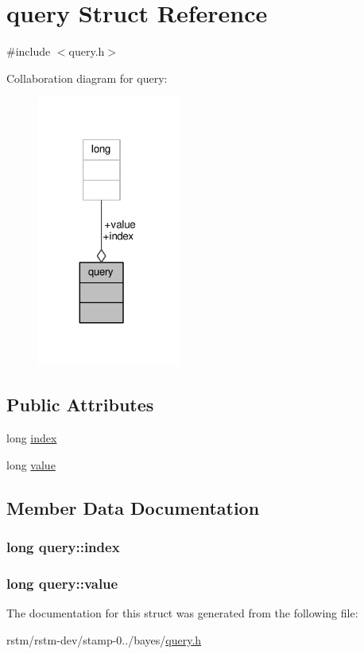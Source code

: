 \hypertarget{structquery}{\section{query Struct Reference}
\label{structquery}
}


{\ttfamily \#include $<$query.\-h$>$}



Collaboration diagram for query\-:
\nopagebreak
\begin{figure}[H]
\begin{center}
\leavevmode
\includegraphics[width=133pt]{structquery__coll__graph}
\end{center}
\end{figure}
\subsection*{Public Attributes}
\begin{DoxyCompactItemize}
\item 
long \hyperlink{structquery_a97d906000ed53eb3276cd918d3c9a5db}{index}
\item 
long \hyperlink{structquery_af9fca35056ad68e75792413f6acdab81}{value}
\end{DoxyCompactItemize}


\subsection{Member Data Documentation}
\hypertarget{structquery_a97d906000ed53eb3276cd918d3c9a5db}{
\subsubsection[{index}]{\setlength{\rightskip}{0pt plus 5cm}long query\-::index}}\label{structquery_a97d906000ed53eb3276cd918d3c9a5db}
\hypertarget{structquery_af9fca35056ad68e75792413f6acdab81}{
\subsubsection[{value}]{\setlength{\rightskip}{0pt plus 5cm}long query\-::value}}\label{structquery_af9fca35056ad68e75792413f6acdab81}


The documentation for this struct was generated from the following file\-:\begin{DoxyCompactItemize}
\item 
rstm/rstm-\/dev/stamp-\/0../bayes/\hyperlink{query_8h}{query.\-h}\end{DoxyCompactItemize}
